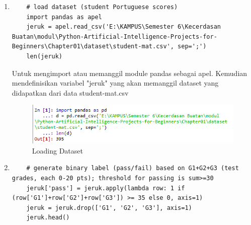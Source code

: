 \begin{enumerate}

\item
\begin{verbatim}
	# load dataset (student Portuguese scores)
	import pandas as apel
	jeruk = apel.read_csv('E:\KAMPUS\Semester 6\Kecerdasan Buatan\modul\Python-Artificial-Intelligence-Projects-for-			 	Beginners\Chapter01\dataset\student-mat.csv', sep=';')
	len(jeruk)
\end{verbatim}

\par
Untuk mengimport atau memanggil module pandas sebagai apel. Kemudian mendefinisikan variabel "jeruk" yang akan memanggil dataset yang didapatkan dari data student-mat.csv 
\begin{figure}[ht]
\centering
\includegraphics[scale=0.5]{figures/spyder/1.png}
\caption{Loading Dataset}
\label{Spyder}
\end{figure}
\item
\begin{verbatim}
	# generate binary label (pass/fail) based on G1+G2+G3 (test grades, each 0-20 pts); threshold for passing is sum>=30
	jeruk['pass'] = jeruk.apply(lambda row: 1 if (row['G1']+row['G2']+row['G3']) >= 35 else 0, axis=1)
	jeruk = jeruk.drop(['G1', 'G2', 'G3'], axis=1)
	jeruk.head()
\end{verbatim}


\end{enumerate}
